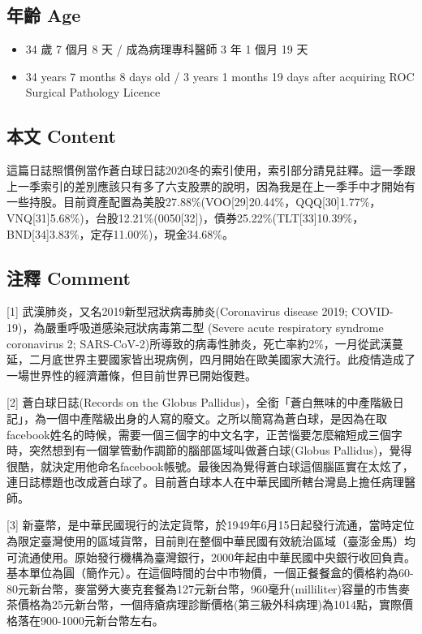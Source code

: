 \documentclass[a5paper, 10pt
]{book}
\providecommand{\tightlist}{%
  \setlength{\itemsep}{0pt}\setlength{\parskip}{0pt}}
\begin{document}
\hypertarget{ux5e74ux9f61-age}{%
\subsection{年齡 Age}\label{ux5e74ux9f61-age}}

\begin{itemize}
\tightlist
\item
  34 歲 7 個月 8 天 / 成為病理專科醫師 3 年 1 個月 19 天
\item
  34 years 7 months 8 days old / 3 years 1 months 19 days after
  acquiring ROC Surgical Pathology Licence
\end{itemize}

\hypertarget{ux672cux6587-content}{%
\subsection{本文 Content}\label{ux672cux6587-content}}

這篇日誌照慣例當作蒼白球日誌2020冬的索引使用，索引部分請見註釋。這一季跟上一季索引的差別應該只有多了六支股票的說明，因為我是在上一季手中才開始有一些持股。目前資產配置為美股27.88\%(VOO{[}29{]}20.44\%，QQQ{[}30{]}1.77\%，VNQ{[}31{]}5.68\%)，台股12.21\%(0050{[}32{]})，債券25.22\%(TLT{[}33{]}10.39\%，BND{[}34{]}3.83\%，定存11.00\%)，現金34.68\%。

\hypertarget{ux6ce8ux91cb-comment}{%
\subsection{注釋 Comment}\label{ux6ce8ux91cb-comment}}

{[}1{]} 武漢肺炎，又名2019新型冠狀病毒肺炎(Coronavirus disease 2019;
COVID-19)，為嚴重呼吸道感染冠狀病毒第二型 (Severe acute respiratory
syndrome coronavirus 2;
SARS-CoV-2)所導致的病毒性肺炎，死亡率約2\%，一月從武漢蔓延，二月底世界主要國家皆出現病例，四月開始在歐美國家大流行。此疫情造成了一場世界性的經濟蕭條，但目前世界已開始復甦。

{[}2{]} 蒼白球日誌(Records on the Globus
Pallidus)，全銜「蒼白無味的中產階級日記」，為一個中產階級出身的人寫的廢文。之所以簡寫為蒼白球，是因為在取facebook姓名的時候，需要一個三個字的中文名字，正苦惱要怎麼縮短成三個字時，突然想到有一個掌管動作調節的腦部區域叫做蒼白球(Globus
Pallidus)，覺得很酷，就決定用他命名facebook帳號。最後因為覺得蒼白球這個腦區實在太炫了，連日誌標題也改成蒼白球了。目前蒼白球本人在中華民國所轄台灣島上擔任病理醫師。

{[}3{]}
新臺幣，是中華民國現行的法定貨幣，於1949年6月15日起發行流通，當時定位為限定臺灣使用的區域貨幣，目前則在整個中華民國有效統治區域（臺澎金馬）均可流通使用。原始發行機構為臺灣銀行，2000年起由中華民國中央銀行收回負責。基本單位為圓（簡作元）。在這個時間的台中市物價，一個正餐餐盒的價格約為60-80元新台幣，麥當勞大麥克套餐為127元新台幣，960毫升(milliliter)容量的市售麥茶價格為25元新台幣，一個痔瘡病理診斷價格(第三級外科病理)為1014點，實際價格落在900-1000元新台幣左右。
\end{document}
